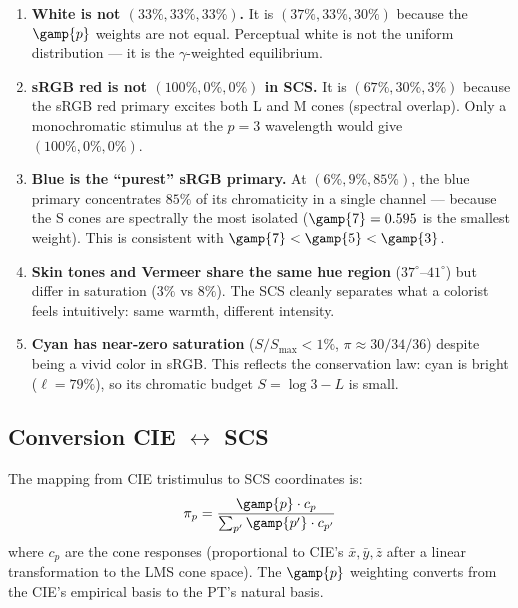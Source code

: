 \documentclass[12pt,a4paper]{article}
\begin{document}
\begin{enumerate}[nosep]
\item \textbf{White is not $(33\%, 33\%, 33\%)$.} It is $(37\%, 33\%,
  30\%)$ because the $\gamp{p}$ weights are not equal. Perceptual
  white is not the uniform distribution --- it is the
  $\gamma$-weighted equilibrium.

\item \textbf{sRGB red is not $(100\%, 0\%, 0\%)$ in SCS.} It is
  $(67\%, 30\%, 3\%)$ because the sRGB red primary excites both L and
  M cones (spectral overlap). Only a monochromatic stimulus at the
  $p=3$ wavelength would give $(100\%, 0\%, 0\%)$.

\item \textbf{Blue is the ``purest'' sRGB primary.} At $(6\%, 9\%,
  85\%)$, the blue primary concentrates $85\%$ of its chromaticity in
  a single channel --- because the S cones are spectrally the most
  isolated ($\gamp{7} = 0.595$ is the smallest weight). This is
  consistent with $\gamp{7} < \gamp{5} < \gamp{3}$.

\item \textbf{Skin tones and Vermeer share the same hue region}
  ($37^\circ$--$41^\circ$) but differ in saturation ($3\%$ vs $8\%$).
  The SCS cleanly separates what a colorist feels intuitively: same
  warmth, different intensity.

\item \textbf{Cyan has near-zero saturation} ($S/S_{\max} < 1\%$,
  $\pi \approx 30/34/36$) despite being a vivid color in sRGB. This
  reflects the conservation law: cyan is bright ($\ell = 79\%$), so
  its chromatic budget $S = \log 3 - L$ is small.
\end{enumerate}

\subsection{Conversion CIE $\leftrightarrow$ SCS}

The mapping from CIE tristimulus to SCS coordinates is:
\begin{equation}
  \pi_p = \frac{\gamp{p} \cdot c_p}{\sum_{p'} \gamp{p'} \cdot c_{p'}}
\end{equation}
where $c_p$ are the cone responses (proportional to CIE's $\bar{x},
\bar{y}, \bar{z}$ after a linear transformation to the LMS cone space).
The $\gamp{p}$ weighting converts from the CIE's empirical basis to
the PT's natural basis.

\end{document}
